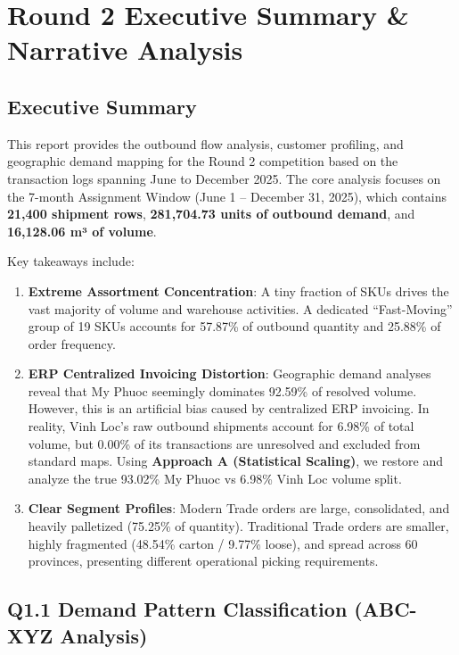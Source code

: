 \documentclass[11pt]{article}
\author{}
\date{}
\begin{document}
\section{Round 2 Executive Summary \& Narrative Analysis}\label{round-2-executive-summary-narrative-analysis}

\subsection{Executive Summary}\label{executive-summary}

This report provides the outbound flow analysis, customer profiling, and geographic demand mapping for the Round 2 competition based on the transaction logs spanning June to December 2025. The core analysis focuses on the 7-month Assignment Window (June 1 -- December 31, 2025), which contains \textbf{21,400 shipment rows}, \textbf{281,704.73 units of outbound demand}, and \textbf{16,128.06 m³ of volume}.

Key takeaways include:
\begin{enumerate}
\item \textbf{Extreme Assortment Concentration}: A tiny fraction of SKUs drives the vast majority of volume and warehouse activities. A dedicated ``Fast-Moving'' group of 19 SKUs accounts for 57.87\% of outbound quantity and 25.88\% of order frequency.
\item \textbf{ERP Centralized Invoicing Distortion}: Geographic demand analyses reveal that My Phuoc seemingly dominates 92.59\% of resolved volume. However, this is an artificial bias caused by centralized ERP invoicing. In reality, Vinh Loc's raw outbound shipments account for 6.98\% of total volume, but 0.00\% of its transactions are unresolved and excluded from standard maps. Using \textbf{Approach A (Statistical Scaling)}, we restore and analyze the true 93.02\% My Phuoc vs 6.98\% Vinh Loc volume split.
\item \textbf{Clear Segment Profiles}: Modern Trade orders are large, consolidated, and heavily palletized (75.25\% of quantity). Traditional Trade orders are smaller, highly fragmented (48.54\% carton / 9.77\% loose), and spread across 60 provinces, presenting different operational picking requirements.
\end{enumerate}

\subsection{Q1.1 Demand Pattern Classification (ABC-XYZ Analysis)}\label{q1.1-demand-pattern-classification-abc-xyz-analysis}
\end{document}
